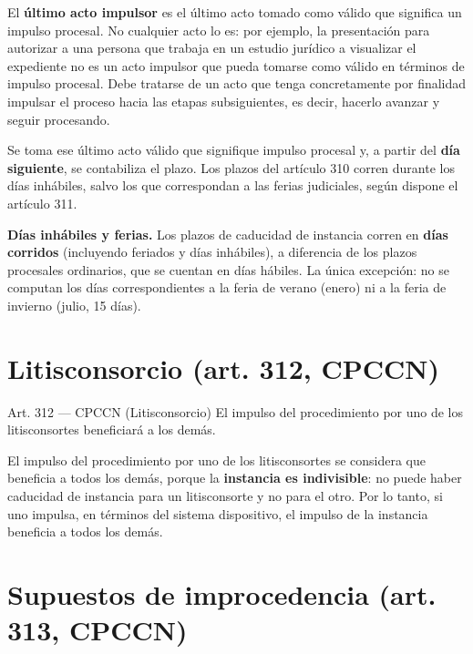 \documentclass[12pt,oneside]{book}
\begin{document}
El \textbf{último acto impulsor} es el último acto tomado como válido que significa un impulso procesal. No cualquier acto lo es: por ejemplo, la presentación para autorizar a una persona que trabaja en un estudio jurídico a visualizar el expediente no es un acto impulsor que pueda tomarse como válido en términos de impulso procesal. Debe tratarse de un acto que tenga concretamente por finalidad impulsar el proceso hacia las etapas subsiguientes, es decir, hacerlo avanzar y seguir procesando.

Se toma ese último acto válido que signifique impulso procesal y, a partir del \textbf{día siguiente}, se contabiliza el plazo. Los plazos del artículo 310 corren durante los días inhábiles, salvo los que correspondan a las ferias judiciales, según dispone el artículo 311.

\begin{important}
\textbf{Días inhábiles y ferias.} Los plazos de caducidad de instancia corren en \textbf{días corridos} (incluyendo feriados y días inhábiles), a diferencia de los plazos procesales ordinarios, que se cuentan en días hábiles. La única excepción: no se computan los días correspondientes a la feria de verano (enero) ni a la feria de invierno (julio, 15 días).
\end{important}

\section{Litisconsorcio (art. 312, CPCCN)}

\begin{articulo}{Art. 312 --- CPCCN (Litisconsorcio)}
El impulso del procedimiento por uno de los litisconsortes beneficiará a los demás.
\end{articulo}

El impulso del procedimiento por uno de los litisconsortes se considera que beneficia a todos los demás, porque la \textbf{instancia es indivisible}: no puede haber caducidad de instancia para un litisconsorte y no para el otro. Por lo tanto, si uno impulsa, en términos del sistema dispositivo, el impulso de la instancia beneficia a todos los demás.

\section{Supuestos de improcedencia (art. 313, CPCCN)}
\end{document}
